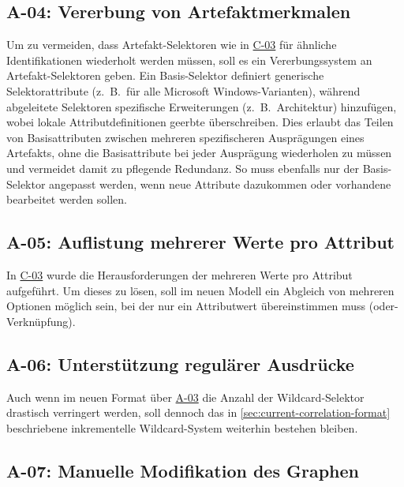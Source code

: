 \subsection{A-04: Vererbung von Artefaktmerkmalen}\label{subsec:req-selektor-inheritance}

Um zu vermeiden, dass Artefakt-Selektoren wie in \hyperref[subsec:c-03-duplizierte-artefakt-selektoren]{C-03} für ähnliche Identifikationen wiederholt werden müssen, soll es ein Vererbungssystem an Artefakt-Selektoren geben.
Ein Basis-Selektor definiert generische Selektorattribute (z.\ B.\ für alle Microsoft Windows-Varianten), während abgeleitete Selektoren spezifische Erweiterungen (z.\ B.\ Architektur) hinzufügen, wobei lokale Attributdefinitionen geerbte überschreiben.
Dies erlaubt das Teilen von Basisattributen zwischen mehreren spezifischeren Ausprägungen eines Artefakts, ohne die Basisattribute bei jeder Ausprägung wiederholen zu müssen und vermeidet damit zu pflegende Redundanz.
So muss ebenfalls nur der Basis-Selektor angepasst werden, wenn neue Attribute dazukommen oder vorhandene bearbeitet werden sollen.

\subsection{A-05: Auflistung mehrerer Werte pro Attribut}\label{subsec:req-multiple-attribute-values}

In \hyperref[subsec:c-03-duplizierte-artefakt-selektoren]{C-03} wurde die Herausforderungen der mehreren Werte pro Attribut aufgeführt.
Um dieses zu lösen, soll im neuen Modell ein Abgleich von mehreren Optionen möglich sein, bei der nur ein Attributwert übereinstimmen muss (oder-Verknüpfung).

\subsection{A-06: Unterstützung regulärer Ausdrücke}\label{subsec:req-regex-support}

Auch wenn im neuen Format über \hyperref[subsec:req-type-specific-matching]{A-03} die Anzahl der Wildcard-Selektor drastisch verringert werden, soll dennoch das in \autoref{sec:current-correlation-format} beschriebene inkrementelle Wildcard-System weiterhin bestehen bleiben.

\subsection{A-07: Manuelle Modifikation des Graphen}\label{subsec:req-manual-format-modification}

